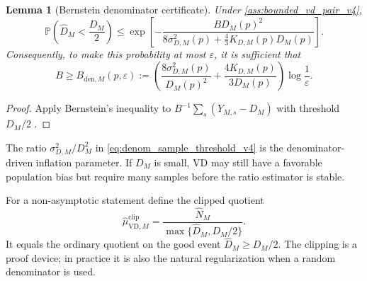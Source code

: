 \documentclass[11pt]{article}
\newtheorem{lemma}{Lemma}
\newcommand{\Prob}{\mathbb{P}}
\newcommand{\1}{\mathbf{1}}
\begin{document}
\begin{lemma}[Bernstein denominator certificate]
\label{lem:denom_bernstein_v4}
Under \cref{ass:bounded_vd_pair_v4},
\begin{equation}
    \Prob\!\left(\widehat D_M<\frac{D_M}{2}\right)
    \leq
    \exp\!\left[-\frac{B D_M(p)^2}{8\sigma_{D,M}^2(p)+\frac{4}{3}K_{D,M}(p)D_M(p)}\right].
    \label{eq:bernstein_denominator_v4}
\end{equation}
Consequently, to make this probability at most \(\varepsilon\), it is sufficient that
\begin{equation}
    B\geq
    B_{\mathrm{den},M}(p,\varepsilon)
    :=
    \left(\frac{8\sigma_{D,M}^2(p)}{D_M(p)^2}
    +\frac{4K_{D,M}(p)}{3D_M(p)}\right)
    \log\!\frac1\varepsilon.
    \label{eq:denom_sample_threshold_v4}
\end{equation}
\end{lemma}

\begin{proof}
Apply Bernstein's inequality to \(B^{-1}\sum_s(Y_{M,s}-D_M)\) with threshold \(D_M/2\) \citep{Boucheron2013}.
\end{proof}

The ratio \(\sigma_{D,M}^2/D_M^2\) in \cref{eq:denom_sample_threshold_v4} is the denominator-driven inflation parameter.  If \(D_M\) is small, VD may still have a favorable population bias but require many samples before the ratio estimator is stable.

For a non-asymptotic statement define the clipped quotient
\begin{equation}
    \widehat\mu_{\mathrm{VD},M}^{\mathrm{clip}}
    =\frac{\widehat N_M}{\max\{\widehat D_M,D_M/2\}}.
    \label{eq:clipped_quotient_v4}
\end{equation}
It equals the ordinary quotient on the good event \(\widehat D_M\geq D_M/2\).  The clipping is a proof device; in practice it is also the natural regularization when a random denominator is used.
\end{document}
